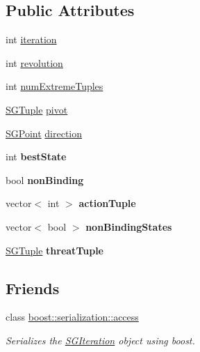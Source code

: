 \subsection*{Public Attributes}
\begin{DoxyCompactItemize}
\item 
int \hyperlink{classSGIteration_a44a4f9e3cb074181292ae816b2c28d9e}{iteration}
\item 
int \hyperlink{classSGIteration_a21cc5c4fc7c40ff444ac7e3743c13940}{revolution}
\item 
int \hyperlink{classSGIteration_a14ecfb94b3111911d9b0ef545f72e88d}{num\-Extreme\-Tuples}
\item 
\hyperlink{classSGTuple}{S\-G\-Tuple} \hyperlink{classSGIteration_abdae7d336968af3515e7d9590cbcc46d}{pivot}
\item 
\hyperlink{classSGPoint}{S\-G\-Point} \hyperlink{classSGIteration_ac35e7e3049cd60c695a366cb8f75db37}{direction}
\item 
\hypertarget{classSGIteration_a16f16d027bab6baffeee1f4cadb3ce8f}{int {\bfseries best\-State}}\label{classSGIteration_a16f16d027bab6baffeee1f4cadb3ce8f}

\item 
\hypertarget{classSGIteration_a7520e6ea4903e8b32884294a3c65b331}{bool {\bfseries non\-Binding}}\label{classSGIteration_a7520e6ea4903e8b32884294a3c65b331}

\item 
\hypertarget{classSGIteration_ade2d5d602a23f5a83a76283fa4dcec87}{vector$<$ int $>$ {\bfseries action\-Tuple}}\label{classSGIteration_ade2d5d602a23f5a83a76283fa4dcec87}

\item 
\hypertarget{classSGIteration_a0b0ff346322adc15505863b4db3b999f}{vector$<$ bool $>$ {\bfseries non\-Binding\-States}}\label{classSGIteration_a0b0ff346322adc15505863b4db3b999f}

\item 
\hypertarget{classSGIteration_acaf191aa3e5adddbf1052602c927d03f}{\hyperlink{classSGTuple}{S\-G\-Tuple} {\bfseries threat\-Tuple}}\label{classSGIteration_acaf191aa3e5adddbf1052602c927d03f}

\end{DoxyCompactItemize}
\subsection*{Friends}
\begin{DoxyCompactItemize}
\item 
\hypertarget{classSGIteration_ac98d07dd8f7b70e16ccb9a01abf56b9c}{class \hyperlink{classSGIteration_ac98d07dd8f7b70e16ccb9a01abf56b9c}{boost\-::serialization\-::access}}\label{classSGIteration_ac98d07dd8f7b70e16ccb9a01abf56b9c}

\begin{DoxyCompactList}\small\item\em Serializes the \hyperlink{classSGIteration}{S\-G\-Iteration} object using boost. \end{DoxyCompactList}\end{DoxyCompactItemize}


